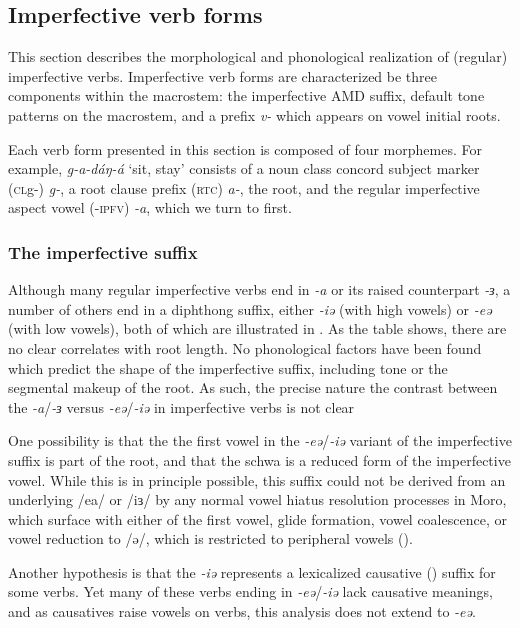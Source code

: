 \subsection{Imperfective verb forms}\label{sec:ch11:ipfvform}

This section describes the morphological and phonological realization of (regular) imperfective verbs. Imperfective verb forms are characterized be three components within the macrostem: the imperfective AMD suffix, default tone patterns on the macrostem, and a prefix \textit{v-} which appears on vowel initial roots.

Each verb form presented in this section is composed of four morphemes. For example, \textit{g-a-dáŋ-á} ‘sit, stay’ consists of a noun class concord subject marker (\textsc{cl}g-) \textit{g-}, a root clause prefix (\textsc{rtc}) \textit{a-}, the root, and the regular imperfective aspect vowel (-\textsc{ipfv}) \textit{-a}, which we turn to first.

\subsubsection{The imperfective suffix}

Although many regular imperfective verbs end in \textit{-a} or its raised counterpart \textit{-ɜ}, a number of others end in a diphthong suffix, either \textit{-iə} (with high vowels) or \textit{-eə} (with low vowels), both of which are illustrated in . As the table shows, there are no clear correlates with root length. No phonological factors have been found which predict the shape of the imperfective suffix, including tone or the segmental makeup of the root. As such, the precise nature the contrast between the \textit{-a}/\textit{-ɜ} versus \textit{-eə}/\textit{-iə} in imperfective verbs is not clear

One possibility is that the the first vowel in the \textit{-eə}/\textit{-iə} variant of the imperfective suffix is part of the root, and that the schwa is a reduced form of the imperfective vowel. While this is in principle possible, this suffix could not be derived from an underlying /ea/ or /iɜ/ by any normal vowel hiatus resolution processes in Moro, which surface with either of the first vowel, glide formation, vowel coalescence, or vowel reduction to /ə/, which is restricted to peripheral vowels ().

Another hypothesis is that the \textit{-iə} represents a lexicalized causative () suffix for some verbs. Yet many of these verbs ending in \textit{-eə}/\textit{-iə} lack causative meanings, and as causatives raise vowels on verbs, this analysis does not extend to \textit{-eə}.


